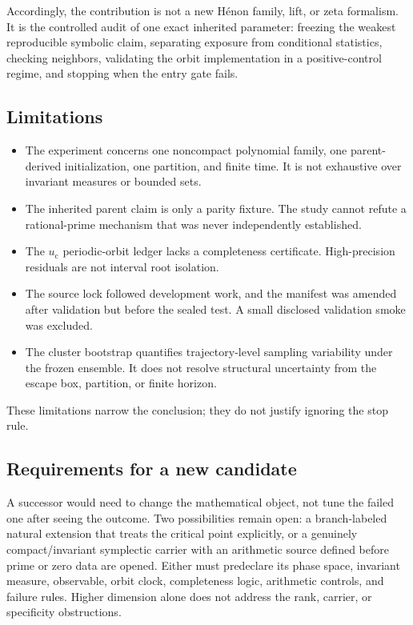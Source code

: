 \documentclass[11pt]{article}
\newcommand{\uc}{u_{\mathrm c}}
\begin{document}
Accordingly, the contribution is not a new H\'enon family, lift, or zeta
formalism. It is the controlled audit of one exact inherited parameter:
freezing the weakest reproducible symbolic claim, separating exposure from
conditional statistics, checking neighbors, validating the orbit
implementation in a positive-control regime, and stopping when the entry
gate fails.

\subsection{Limitations}

\begin{itemize}
 \item The experiment concerns one noncompact polynomial family, one
 parent-derived initialization, one partition, and finite time. It is not
 exhaustive over invariant measures or bounded sets.
 \item The inherited parent claim is only a parity fixture. The study cannot
 refute a rational-prime mechanism that was never independently established.
 \item The \(\uc\) periodic-orbit ledger lacks a completeness certificate.
 High-precision residuals are not interval root isolation.
 \item The source lock followed development work, and the manifest was
 amended after validation but before the sealed test. A small disclosed
 validation smoke was excluded.
 \item The cluster bootstrap quantifies trajectory-level sampling variability
 under the frozen ensemble. It does not resolve structural uncertainty from
 the escape box, partition, or finite horizon.
\end{itemize}

These limitations narrow the conclusion; they do not justify ignoring the
stop rule.

\subsection{Requirements for a new candidate}

A successor would need to change the mathematical object, not tune the failed
one after seeing the outcome. Two possibilities remain open: a branch-labeled
natural extension that treats the critical point explicitly, or a genuinely
compact/invariant symplectic carrier with an arithmetic source defined before
prime or zero data are opened. Either must predeclare its phase space,
invariant measure, observable, orbit clock, completeness logic, arithmetic
controls, and failure rules. Higher dimension alone does not address the
rank, carrier, or specificity obstructions.
\end{document}
